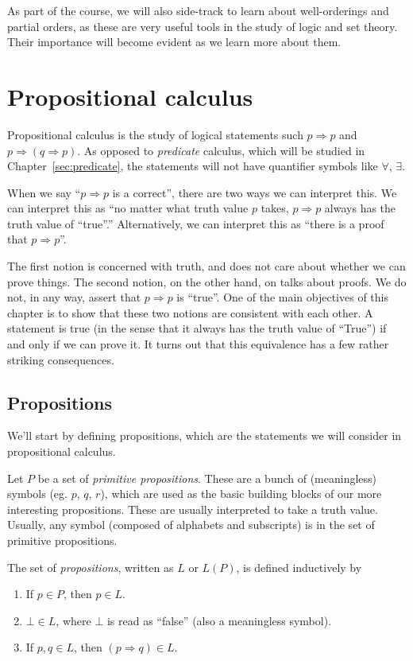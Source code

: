 \documentclass[a4paper]{article}
\begin{document}
As part of the course, we will also side-track to learn about well-orderings and partial orders, as these are very useful tools in the study of logic and set theory. Their importance will become evident as we learn more about them.

\section{Propositional calculus}
\label{sec:propositional}
Propositional calculus is the study of logical statements such $p \Rightarrow p$ and $p \Rightarrow (q\Rightarrow p)$. As opposed to \emph{predicate} calculus, which will be studied in Chapter~\ref{sec:predicate}, the statements will not have quantifier symbols like $\forall$, $\exists$.

When we say ``$p \Rightarrow p$ is a correct'', there are two ways we can interpret this. We can interpret this as ``no matter what truth value $p$ takes, $p \Rightarrow p$ always has the truth value of ``true''.'' Alternatively, we can interpret this as ``there is a proof that $p \Rightarrow p$''.

The first notion is concerned with truth, and does not care about whether we can prove things. The second notion, on the other hand, on talks about proofs. We do not, in any way, assert that $p \Rightarrow  p$ is ``true''. One of the main objectives of this chapter is to show that these two notions are consistent with each other. A statement is true (in the sense that it always has the truth value of ``True'') if and only if we can prove it. It turns out that this equivalence has a few rather striking consequences.

\subsection{Propositions}
We'll start by defining propositions, which are the statements we will consider in propositional calculus.
\begin{defi}[Propositions]
  Let $P$ be a set of \emph{primitive propositions}. These are a bunch of (meaningless) symbols (eg. $p$, $q$, $r$), which are used as the basic building blocks of our more interesting propositions. These are usually interpreted to take a truth value. Usually, any symbol (composed of alphabets and subscripts) is in the set of primitive propositions.

  The set of \emph{propositions}, written as $L$ or $L(P)$, is defined inductively by
  \begin{enumerate}
    \item If $p\in P$, then $p\in L$.
    \item $\bot\in L$, where $\bot$ is read as ``false'' (also a meaningless symbol).
    \item If $p, q\in L$, then $(p\Rightarrow q)\in L$.
  \end{enumerate}
\end{defi}
\end{document}
